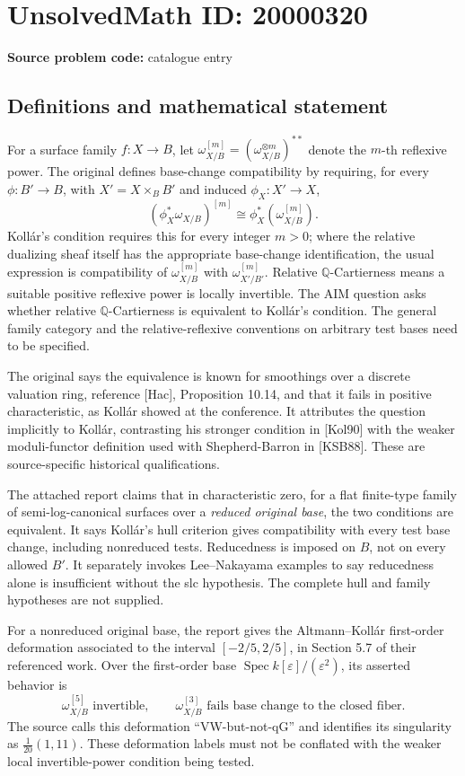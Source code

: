 \documentclass[11pt]{article}
\newcommand{\Q}{\mathbb{Q}}
\begin{document}
\section*{UnsolvedMath ID: 20000320}
\textbf{Source problem code:} catalogue entry
\subsection{Definitions and mathematical statement}
For a surface family \(f:X\to B\), let \(\omega_{X/B}^{[m]}=(\omega_{X/B}^{\otimes m})^{**}\) denote the \(m\)-th reflexive power. The original defines base-change compatibility by requiring, for every \(\phi:B'\to B\), with \(X'=X\times_BB'\) and induced \(\phi_X:X'\to X\),
\[
(\phi_X^*\omega_{X/B})^{[m]}\cong\phi_X^*(\omega_{X/B}^{[m]}).
\]
Koll\'ar's condition requires this for every integer \(m>0\); where the relative dualizing sheaf itself has the appropriate base-change identification, the usual expression is compatibility of \(\omega_{X/B}^{[m]}\) with \(\omega_{X'/B'}^{[m]}\). Relative \(\Q\)-Cartierness means a suitable positive reflexive power is locally invertible. The AIM question asks whether relative \(\Q\)-Cartierness is equivalent to Koll\'ar's condition. The general family category and the relative-reflexive conventions on arbitrary test bases need to be specified.

The original says the equivalence is known for smoothings over a discrete valuation ring, reference [Hac], Proposition 10.14, and that it fails in positive characteristic, as Koll\'ar showed at the conference. It attributes the question implicitly to Koll\'ar, contrasting his stronger condition in [Kol90] with the weaker moduli-functor definition used with Shepherd-Barron in [KSB88]. These are source-specific historical qualifications.

The attached report claims that in characteristic zero, for a flat finite-type family of semi-log-canonical surfaces over a \emph{reduced original base}, the two conditions are equivalent. It says Koll\'ar's hull criterion gives compatibility with every test base change, including nonreduced tests. Reducedness is imposed on \(B\), not on every allowed \(B'\). It separately invokes Lee--Nakayama examples to say reducedness alone is insufficient without the slc hypothesis. The complete hull and family hypotheses are not supplied.

For a nonreduced original base, the report gives the Altmann--Koll\'ar first-order deformation associated to the interval \([-2/5,2/5]\), in Section 5.7 of their referenced work. Over the first-order base \(\operatorname{Spec}k[\varepsilon]/(\varepsilon^2)\), its asserted behavior is
\[
\omega_{X/B}^{[5]}\text{ invertible},\qquad
\omega_{X/B}^{[3]}\text{ fails base change to the closed fiber}.
\]
The source calls this deformation ``VW-but-not-qG'' and identifies its singularity as \(\tfrac1{20}(1,11)\). These deformation labels must not be conflated with the weaker local invertible-power condition being tested.
\end{document}
